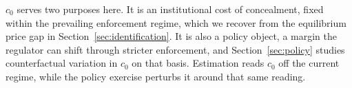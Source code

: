 $c_0$ serves two purposes here. It is an institutional cost of concealment, fixed within the prevailing enforcement regime, which we recover from the equilibrium price gap in Section~\ref{sec:identification}. It is also a policy object, a margin the regulator can shift through stricter enforcement, and Section~\ref{sec:policy} studies counterfactual variation in $c_0$ on that basis. Estimation reads $c_0$ off the current regime, while the policy exercise perturbs it around that same reading.
